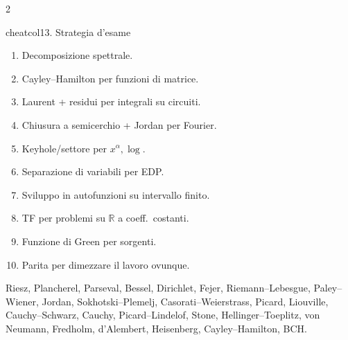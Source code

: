 \documentclass[10pt,a4paper]{article}
\newcommand{\R}{\mathbb{R}}
\begin{document}
\begin{multicols}{2}
\begin{secbox}{cheatcol}{13. Strategia d'esame}
\begin{enumerate}
\item Decomposizione spettrale.
\item Cayley--Hamilton per funzioni di matrice.
\item Laurent + residui per integrali su circuiti.
\item Chiusura a semicerchio + Jordan per Fourier.
\item Keyhole/settore per $x^\alpha,\log$.
\item Separazione di variabili per EDP.
\item Sviluppo in autofunzioni su intervallo finito.
\item TF per problemi su $\R$ a coeff.\ costanti.
\item Funzione di Green per sorgenti.
\item Parita per dimezzare il lavoro ovunque.
\end{enumerate}

Riesz, Plancherel, Parseval, Bessel, Dirichlet, Fejer, Riemann--Lebesgue, Paley--Wiener, Jordan, Sokhotski--Plemelj, Casorati--Weierstrass, Picard, Liouville, Cauchy--Schwarz, Cauchy, Picard--Lindelof, Stone, Hellinger--Toeplitz, von Neumann, Fredholm, d'Alembert, Heisenberg, Cayley--Hamilton, BCH.

\end{secbox}

\end{multicols}
\end{document}
